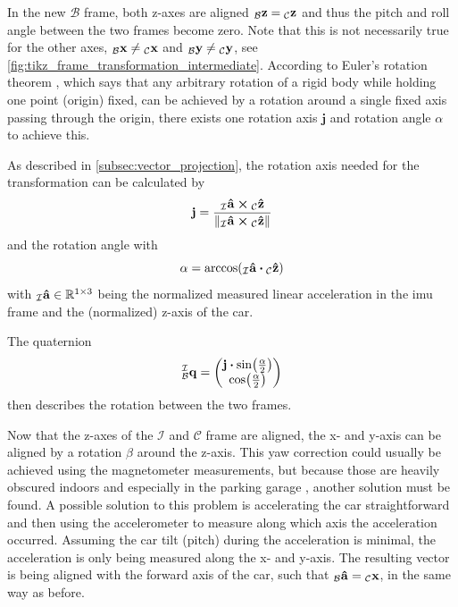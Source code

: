 In the new $\mathcal{B}$ frame, both z-axes are aligned $\vincs{z}{b} = \vincs{z}{c}$ and thus the pitch and roll angle between the two frames become zero.
Note that this is not necessarily true for the other axes, $\vincs{x}{b}\neq\vincs{x}{c}$ and $\vincs{y}{b}\neq\vincs{y}{c}$, see \cref{fig:tikz_frame_transformation_intermediate}.
According to Euler's rotation theorem \cite{Euler1776}, which says that any arbitrary rotation of a rigid body while holding one point (origin) fixed, can be achieved by a rotation around a single fixed axis passing through the origin, there exists one rotation axis $\mathbf{j}$ and rotation angle $\alpha$ to achieve this.\par
As described in \cref{subsec:vector_projection}, the rotation axis needed for the transformation can be calculated by
\begin{equation}
	\vb{j} = \frac{\vincs{\vu{a}}{i} \cp \vincs{\vu{z}}{c}}{\norm{\vincs{\vu{a}}{i} \cp \vincs{\vu{z}}{c}}}
\end{equation}
and the rotation angle with
\begin{equation}
	\alpha = \arccos(\vincs{\vu{a}}{i}\vdot \vincs{\vu{z}}{c})
\end{equation}
with $\vincs{\vu{a}}{i} \in \mathbb{R}^{1\times3}$ being the normalized measured linear acceleration in the \gls{imu} frame and  the (normalized) z-axis of the car.\par
The quaternion
\begin{equation}
	\qtf{i}{b} =
	\begin{pmatrix}
		\vb{j}\vdot\sin(\frac{\alpha}{2}) \\
		\cos(\frac{\alpha}{2})
	\end{pmatrix}
\end{equation}
then describes the rotation between the two frames.\par
Now that the z-axes of the $\mathcal{I}$ and $\mathcal{C}$ frame are aligned, the x- and y-axis can be aligned by a rotation $\beta$ around the z-axis.
This yaw correction could usually be achieved using the magnetometer measurements, but because those are heavily obscured indoors and especially in the parking garage \cite{Li2012}, another solution must be found.
A possible solution to this problem is accelerating the car straightforward and then using the accelerometer to measure along which axis the acceleration occurred.
Assuming the car tilt (pitch) during the acceleration is minimal, the acceleration is only being measured along the x- and y-axis.
The resulting vector is being aligned with the forward axis of the car, such that $\vincs{\hat{a}}{b} = \vincs{x}{c}$, in the same way as before.

